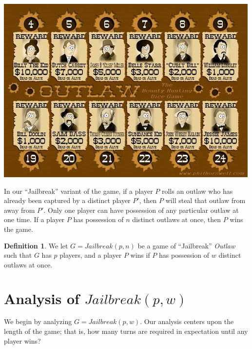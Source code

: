 \documentclass{article}
\theoremstyle{definition}
\newtheorem{defn}{Definition}
\theoremstyle{plain}
\begin{document}
	\begin{center}
	\includegraphics[scale=0.5]{outlaw_board}
	\end{center}
	
	In our ``Jailbreak'' variant of the game, if a player $P$ rolls an outlaw who has already been captured by a distinct player $P'$, then $P$ will steal that outlaw from away from $P'$. Only one player can have possession of any particular outlaw at one time. If a player $P$ has possession of $n$ distinct outlaws at once, then $P$ wins the game.
	
	\begin{defn}
	We let $G = Jailbreak(p, n)$ be  a game of ``Jailbreak'' \textit{Outlaw} such that $G$ has $p$ players, and a player $P$ wins if $P$ has possession of $w$ distinct outlaws at once.
	\end{defn}
	
	\section{Analysis of $Jailbreak(p, w)$}

	We begin by analyzing $G = Jailbreak(p, w)$. Our analysis centers upon the length of the game; that is, how many turns are required in expectation until any player wins?
\end{document}

